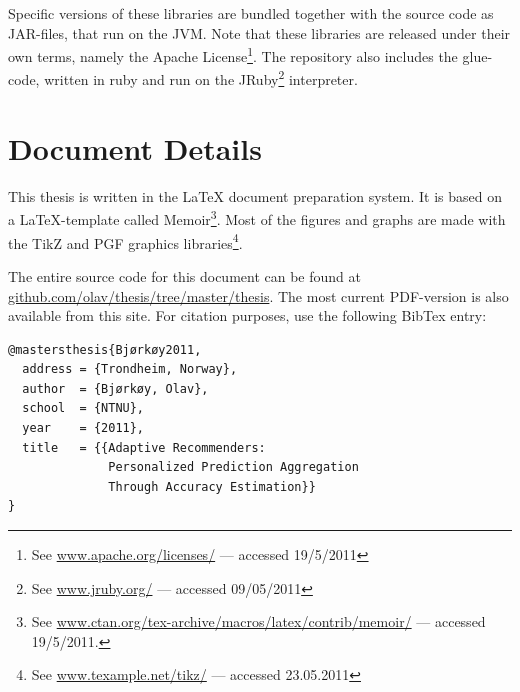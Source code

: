 Specific versions of these libraries are bundled together with
the source code as JAR-files, that run on the JVM.
Note that these libraries are released under their own terms,
namely the Apache License\footnote{
See \url{www.apache.org/licenses/} --- accessed 19/5/2011}.
The repository also includes the glue-code, written in ruby and run on the JRuby\footnote{
See \url{www.jruby.org/} --- accessed 09/05/2011} interpreter.

\section{Document Details}

This thesis is written in the LaTeX document preparation system.
It is based on a LaTeX-template called Memoir\footnote{
See \url{www.ctan.org/tex-archive/macros/latex/contrib/memoir/} --- accessed 19/5/2011.}.
Most of the figures and graphs are made with the TikZ and PGF graphics libraries\footnote{
See \url{www.texample.net/tikz/} --- accessed 23.05.2011}.

The entire source code for this document can be found at 
\url{github.com/olav/thesis/tree/master/thesis}.
The most current PDF-version is also available from this site.
For citation purposes, use the following BibTex entry:

{
\footnotesize
\begin{verbatim}
@mastersthesis{Bjørkøy2011,
  address = {Trondheim, Norway},
  author  = {Bjørkøy, Olav},
  school  = {NTNU},
  year    = {2011},
  title   = {{Adaptive Recommenders: 
              Personalized Prediction Aggregation
              Through Accuracy Estimation}}
} 
\end{verbatim}
}

